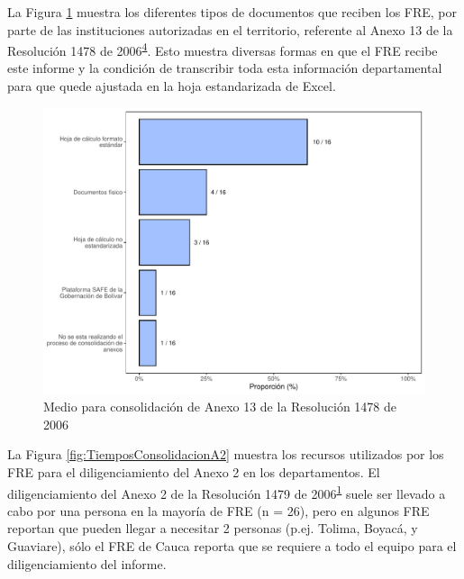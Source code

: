 \documentclass[
]{book}
\begin{document}
La Figura \ref{fig:RecepcionA13} muestra los diferentes tipos de documentos que reciben los FRE, por parte de las instituciones autorizadas en el territorio, referente al Anexo 13 de la Resolución 1478 de 2006\textsuperscript{\protect\hyperlink{ref-MSPS1478-2006}{4}}. Esto muestra diversas formas en que el FRE recibe este informe y la condición de transcribir toda esta información departamental para que quede ajustada en la hoja estandarizada de Excel.

\begin{figure}

{\centering \includegraphics[width=0.85\linewidth]{InformeFinal_files/figure-latex/RecepcionA13-1} 

}

\caption{Medio para consolidación de Anexo 13 de la Resolución 1478 de 2006}\label{fig:RecepcionA13}
\end{figure}

La Figura \ref{fig:TiemposConsolidacionA2} muestra los recursos utilizados por los FRE para el diligenciamiento del Anexo 2 en los departamentos. El diligenciamiento del Anexo 2 de la Resolución 1479 de 2006\textsuperscript{\protect\hyperlink{ref-MSPS1479-2006}{1}} suele ser llevado a cabo por una persona en la mayoría de FRE (n = 26), pero en algunos FRE reportan que pueden llegar a necesitar 2 personas (p.ej. Tolima, Boyacá, y Guaviare), sólo el FRE de Cauca reporta que se requiere a todo el equipo para el diligenciamiento del informe.
\end{document}
